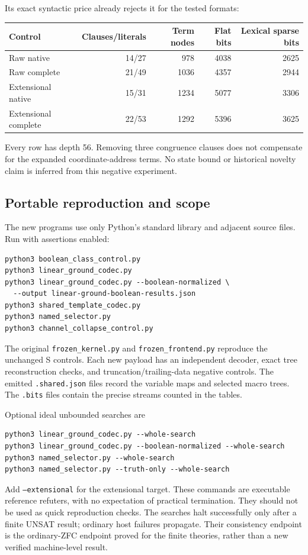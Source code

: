 Its exact syntactic price already rejects it for the tested formats:
\begin{center}
\begin{tabular}{lrrrr}
\toprule
Control & Clauses/literals & Term nodes & Flat bits & Lexical sparse bits\\
\midrule
Raw native &14/27&978&4038&2625\\
Raw complete&21/49&1036&4357&2944\\
Extensional native&15/31&1234&5077&3306\\
Extensional complete&22/53&1292&5396&3625\\
\bottomrule
\end{tabular}
\end{center}
Every row has depth 56.  Removing three congruence clauses does not compensate
for the expanded coordinate-address terms.  No state bound or historical
novelty claim is inferred from this negative experiment.

\subsection{Portable reproduction and scope}

The new programs use only Python's standard library and adjacent source files.
Run with assertions enabled:
\begin{verbatim}
python3 boolean_class_control.py
python3 linear_ground_codec.py
python3 linear_ground_codec.py --boolean-normalized \
  --output linear-ground-boolean-results.json
python3 shared_template_codec.py
python3 named_selector.py
python3 channel_collapse_control.py
\end{verbatim}
The original \texttt{frozen\_kernel.py} and \texttt{frozen\_frontend.py}
reproduce the unchanged S controls.  Each new payload has an independent
decoder, exact tree reconstruction checks, and truncation/trailing-data
negative controls.  The emitted \texttt{.shared.json} files record the
variable maps and selected macro trees.  The \texttt{.bits} files contain
the precise streams counted in the tables.

Optional ideal unbounded searches are
\begin{verbatim}
python3 linear_ground_codec.py --whole-search
python3 linear_ground_codec.py --boolean-normalized --whole-search
python3 named_selector.py --whole-search
python3 named_selector.py --truth-only --whole-search
\end{verbatim}
Add \texttt{--extensional} for the extensional target.  These commands are
executable reference refuters, with no expectation of practical termination.
They should not be used as quick reproduction checks.  The searches halt
successfully only after a finite UNSAT result; ordinary host failures
propagate.  Their consistency endpoint is the ordinary-ZFC endpoint proved
for the finite theories, rather than a new verified machine-level result.

